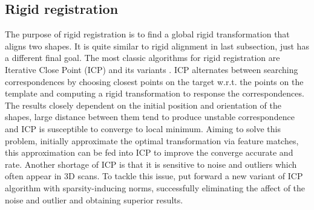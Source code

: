 \subsection{Rigid registration}
The purpose of rigid registration is to find a global rigid transformation that aligns two shapes. It is quite similar to rigid alignment in last subsection, just has a different final goal. The most classic algorithms for rigid registration are Iterative Close Point (ICP) \cite{besl1992method} and its variants \cite{rusinkiewicz2001efficient}. ICP alternates between searching correspondences by choosing closest points on the target w.r.t. the points on the template and computing a rigid transformation to response the correspondences. The results closely dependent on the initial position and orientation of the shapes, large distance between them tend to produce unstable correspondence and ICP is susceptible to converge to local minimum. Aiming to solve this problem, \cite{gelfand2005robust} initially approximate the optimal transformation via feature matches, this approximation can be fed into ICP to improve the converge accurate and rate. Another shortage of ICP is that it is sensitive to noise and outliers which often appear in 3D scans. To tackle this issue, \cite{bouaziz2013sparse} put forward a new variant of ICP algorithm with sparsity-inducing norms, successfully eliminating the affect of the noise and outlier and obtaining superior results.

